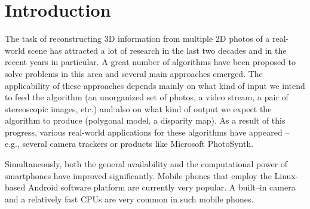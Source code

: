 \chapter*{Introduction}

The task of reconstructing 3D information from multiple 2D photos of a real-world scene has attracted a lot of research in the last two decades and in the recent years in particular.
A great number of algorithms have been proposed to solve problems in this area and several main approaches emerged. 
The applicability of these approaches depends mainly on what kind of input we intend to feed the algorithm 
(an unorganized set of photos, a video stream, a pair of stereoscopic images, etc.) 
and also on what kind of output we expect the algorithm to produce (polygonal model, a disparity map). 
As a result of this progress, various real-world applications for these algorithms have appeared -- 
e.g., several camera trackers or products like Microsoft PhotoSynth. %

Simultaneously, both the general availability and the computational power of smartphones have improved significantly.
Mobile phones that employ the Linux-based Android software platform are currently very popular. 
A built–in camera and a relatively fast CPUs are very common in such mobile phones.

